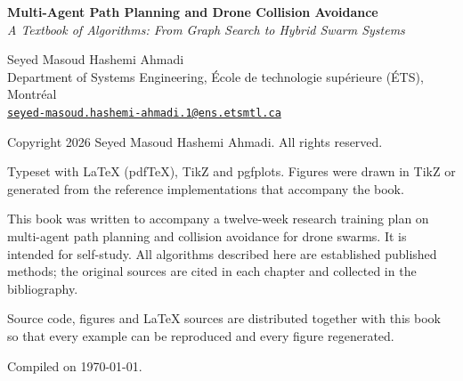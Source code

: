 \thispagestyle{empty}
\vspace*{\fill}
\noindent
\textbf{Multi-Agent Path Planning and Drone Collision Avoidance}\\
\emph{A Textbook of Algorithms: From Graph Search to Hybrid Swarm Systems}

\medskip\noindent
Seyed Masoud Hashemi Ahmadi\\
Department of Systems Engineering, École de technologie supérieure (ÉTS), Montréal\\
\href{mailto:seyed-masoud.hashemi-ahmadi.1@ens.etsmtl.ca}{\nolinkurl{seyed-masoud.hashemi-ahmadi.1@ens.etsmtl.ca}}

\medskip\noindent
Copyright \textcopyright{} 2026 Seyed Masoud Hashemi Ahmadi. All rights reserved.

\medskip\noindent
Typeset with \LaTeX{} (pdf\TeX), TikZ and pgfplots. Figures were drawn in TikZ or generated
from the \python{} reference implementations that accompany the book.

\medskip\noindent
This book was written to accompany a twelve-week research training plan on
multi-agent path planning and collision avoidance for drone swarms. It is intended
for self-study. All algorithms described here are established published methods;
the original sources are cited in each chapter and collected in the bibliography.

\medskip\noindent
Source code, figures and \LaTeX{} sources are distributed together with this book so
that every example can be reproduced and every figure regenerated.

\medskip\noindent
Compiled on \today.
\vspace*{2cm}
\clearpage
